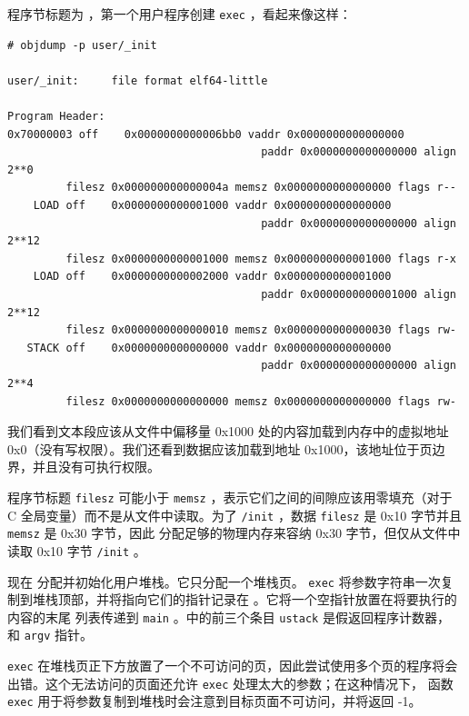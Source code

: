 \documentclass[UTF8]{article}
\begin{document}
程序节标题为
       ，第一个用户程序创建
    \lstinline{exec}    ，看起来像这样：
    \begin{footnotesize}
\begin{verbatim}
# objdump -p user/_init

user/_init:     file format elf64-little

Program Header:
0x70000003 off    0x0000000000006bb0 vaddr 0x0000000000000000
                                       paddr 0x0000000000000000 align 2**0
         filesz 0x000000000000004a memsz 0x0000000000000000 flags r--
    LOAD off    0x0000000000001000 vaddr 0x0000000000000000
                                       paddr 0x0000000000000000 align 2**12
         filesz 0x0000000000001000 memsz 0x0000000000001000 flags r-x
    LOAD off    0x0000000000002000 vaddr 0x0000000000001000
                                       paddr 0x0000000000001000 align 2**12
         filesz 0x0000000000000010 memsz 0x0000000000000030 flags rw-
   STACK off    0x0000000000000000 vaddr 0x0000000000000000
                                       paddr 0x0000000000000000 align 2**4
         filesz 0x0000000000000000 memsz 0x0000000000000000 flags rw-
\end{verbatim}
\end{footnotesize}     

我们看到文本段应该从文件中偏移量 0x1000 处的内容加载到内存中的虚拟地址 0x0（没有写权限）。我们还看到数据应该加载到地址 0x1000，该地址位于页边界，并且没有可执行权限。  

程序节标题
    \lstinline{filesz}    可能小于
    \lstinline{memsz}    ，表示它们之间的间隙应该用零填充（对于 C 全局变量）而不是从文件中读取。为了
    \lstinline{/init}    ，数据
    \lstinline{filesz}    是 0x10 字节并且
    \lstinline{memsz}    是 0x30 字节，因此
        分配足够的物理内存来容纳 0x30 字节，但仅从文件中读取 0x10 字节
    \lstinline{/init}    。  

现在
        分配并初始化用户堆栈。它只分配一个堆栈页。
    \lstinline{exec}    将参数字符串一次复制到堆栈顶部，并将指向它们的指针记录在
        。它将一个空指针放置在将要执行的内容的末尾
        列表传递到
    \lstinline{main}    。中的前三个条目
    \lstinline{ustack}    是假返回程序计数器，
        和
    \lstinline{argv}    指针。  

   \lstinline{exec}    在堆栈页正下方放置了一个不可访问的页，因此尝试使用多个页的程序将会出错。这个无法访问的页面还允许
    \lstinline{exec}    处理太大的参数；在这种情况下，
        函数
    \lstinline{exec}    用于将参数复制到堆栈时会注意到目标页面不可访问，并将返回 -1。  
\end{document}
